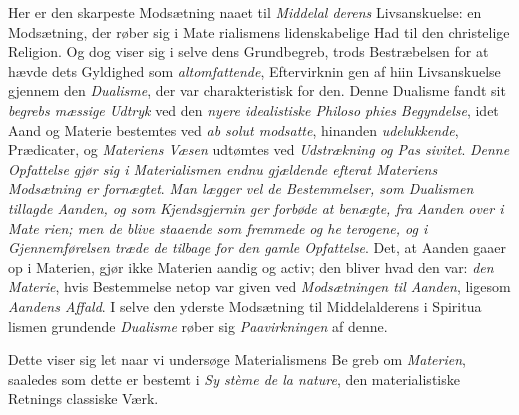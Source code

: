 Her er den skarpeste Modsætning naaet til \emph{Middelal\-%
derens} Livsanskuelse: en Modsætning, der røber sig i Mate\-%
rialismens lidenskabelige Had til den christelige Religion. Og
dog viser sig i selve dens Grundbegreb, trods Bestræbelsen for
at hævde dets Gyldighed som \emph{altomfattende}, Eftervirknin\-%
gen af hiin Livsanskuelse gjennem den \emph{Dualisme}, der var
charakteristisk for den. Denne Dualisme fandt sit \emph{begrebs\-%
mæssige Udtryk} ved den \emph{nyere idealistiske Philoso\-%
phies Begyndelse}, idet Aand og Materie bestemtes ved \emph{ab\-%
solut modsatte}, hinanden \emph{udelukkende}, Prædicater, og
\emph{Materiens Væsen} udtømtes ved \emph{Udstrækning og Pas\-%
sivitet}. \emph{Denne Opfattelse gjør sig i Materialismen
endnu gjældende efterat Materiens Modsætning er
fornægtet}. \emph{Man lægger vel de Bestemmelser, som
Dualismen tillagde Aanden, og som Kjendsgjernin\-%
ger forbøde at benægte, fra Aanden over i Mate\-%
rien; men de blive staaende som fremmede og he\-%
terogene, og i Gjennemførelsen træde de tilbage
for den gamle Opfattelse}. Det, at Aanden gaaer op i
Materien, gjør ikke Materien aandig og activ; den bliver hvad
den var: \emph{den Materie}, hvis Bestemmelse netop var given ved
\emph{Modsætningen til Aanden}, ligesom \emph{Aandens Affald}.
I selve den yderste Modsætning til Middelalderens i Spiritua\-%
lismen grundende \emph{Dualisme} røber sig \emph{Paavirkningen} af denne.

Dette viser sig let naar vi undersøge Materialismens Be\-%
greb om \emph{Materien}, saaledes som dette er bestemt i \emph{Sy\-%
stème de la nature}, den materialistiske Retnings classiske
Værk.

